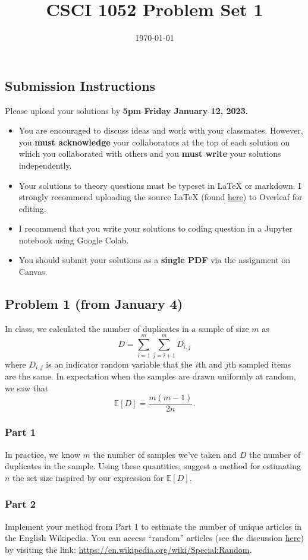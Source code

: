 \documentclass{article}
\title{CSCI 1052 Problem Set 1}
\author{} %
\date{\today}
\begin{document}
\maketitle

\subsection*{Submission Instructions}

Please upload your solutions by
\textbf{5pm Friday January 12, 2023.}
\begin{itemize}
\item You are encouraged to discuss ideas
and work with your classmates. However, you
\textbf{must acknowledge} your collaborators
at the top of each solution on which
you collaborated with others 
and you \textbf{must write} your solutions
independently.
\item Your solutions to theory questions must
be typeset in LaTeX or markdown.
I strongly recommend uploading the source LaTeX (found 
\href{https://www.rtealwitter.com/rads2024/files/ps1.tex}{here})
to Overleaf for editing.
\item I recommend that you write your solutions to coding question in a Jupyter notebook using Google Colab.
\item You should submit your solutions as a \textbf{single PDF} via the assignment on Canvas.
\end{itemize}

\subsection*{Problem 1 (from January 4)}
In class, we calculated the number of duplicates in a sample of size $m$ as
$$
D = \sum_{i=1}^m \sum_{j=i+1}^m D_{i,j}
$$
where $D_{i,j}$ is an indicator random variable that the $i$th and $j$th sampled items are the same.
In expectation when the samples are drawn uniformly at random, we saw that
$$
\mathbb{E}[D] = \frac{m (m-1)}{2 n}.
$$

\subsubsection*{Part 1} 
In practice, we know $m$ the number of samples we've taken and $D$ the number of duplicates in the sample.
Using these quantities, suggest a method for estimating $n$ the set size inspired by our expression for $\mathbb{E}[D]$.

\subsubsection*{Part 2}
Implement your method from Part 1 to estimate the number of unique articles in the English Wikipedia.
You can access ``random'' articles (see the discussion \href{https://en.wikipedia.org/wiki/Wikipedia:FAQ/Technical#random}{here}) by visiting the link: \url{https://en.wikipedia.org/wiki/Special:Random}.
\end{document}
